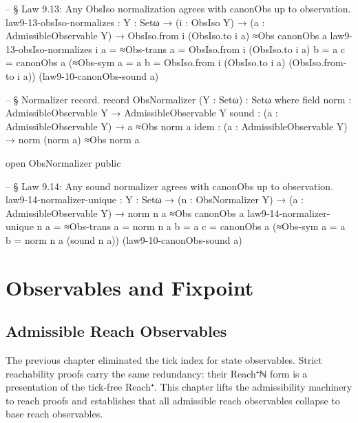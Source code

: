 \documentclass[11pt,a4paper]{book}
\def\texttt#1{#1}%
\begin{document}
\begin{code}
-- § Law 9.13: Any ObsIso normalization agrees with canonObs up to observation.
law9-13-obsIso-normalizes :
  {Y : Setω} →
  (i : ObsIso Y) →
  (a : AdmissibleObservable Y) →
  ObsIso.from i (ObsIso.to i a) ≈Obs canonObs a
law9-13-obsIso-normalizes i a =
  ≈Obs-trans
    {a = ObsIso.from i (ObsIso.to i a)}
    {b = a}
    {c = canonObs a}
    (≈Obs-sym {a = a} {b = ObsIso.from i (ObsIso.to i a)} (ObsIso.from-to i a))
    (law9-10-canonObs-sound a)

-- § Normalizer record.
record ObsNormalizer (Y : Setω) : Setω where
  field
    norm  : AdmissibleObservable Y → AdmissibleObservable Y
    sound : (a : AdmissibleObservable Y) → a ≈Obs norm a
    idem  : (a : AdmissibleObservable Y) → norm (norm a) ≈Obs norm a

open ObsNormalizer public

-- § Law 9.14: Any sound normalizer agrees with canonObs up to observation.
law9-14-normalizer-unique :
  {Y : Setω} →
  (n : ObsNormalizer Y) →
  (a : AdmissibleObservable Y) →
  norm n a ≈Obs canonObs a
law9-14-normalizer-unique n a =
  ≈Obs-trans
    {a = norm n a}
    {b = a}
    {c = canonObs a}
    (≈Obs-sym {a = a} {b = norm n a} (sound n a))
    (law9-10-canonObs-sound a)
\end{code}

\part{Observables and Fixpoint}

\chapter{Admissible Reach Observables}

The previous chapter eliminated the tick index for state observables. Strict reachability proofs carry the same redundancy: their \texttt{Reach⁺ℕ} form is a presentation of the tick-free \texttt{Reach⁺}. This chapter lifts the admissibility machinery to reach proofs and establishes that all admissible reach observables collapse to base reach observables.
\end{document}
